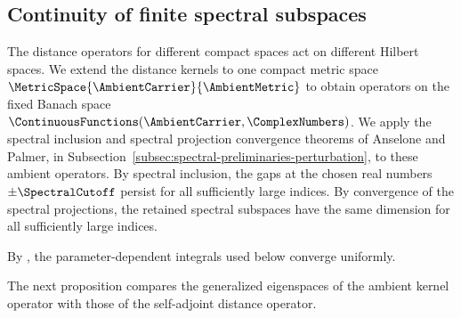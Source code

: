 \subsection{Continuity of finite spectral subspaces}\label{subsec:spectral-subspace-continuity}
The distance operators for different compact spaces act on different Hilbert spaces.
We extend the distance kernels to one compact metric space
$\MetricSpace{\AmbientCarrier}{\AmbientMetric}$
to obtain operators on the fixed Banach space
$\ContinuousFunctions(\AmbientCarrier ,\ComplexNumbers)$.
We apply the spectral inclusion and spectral projection convergence theorems
of Anselone and Palmer,
in Subsection~\ref{subsec:spectral-preliminaries-perturbation},
to these ambient operators.
By spectral inclusion,
the gaps at the chosen real numbers
$\pm\SpectralCutoff$
persist for all sufficiently large indices.
By convergence of the spectral projections,
the retained spectral subspaces
have the same dimension for all sufficiently large indices.

By ,
the parameter-dependent integrals used below converge uniformly.

The next proposition compares the generalized eigenspaces of the ambient
kernel operator with those of the self-adjoint distance operator.

